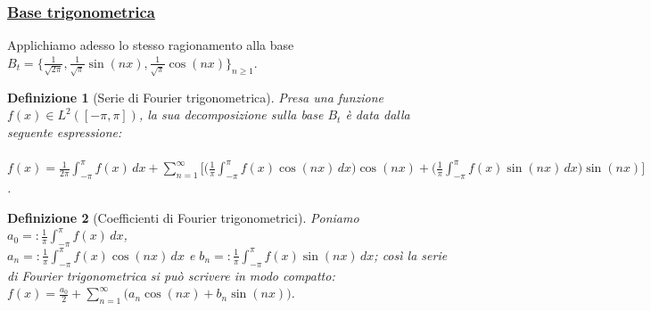 \documentclass[a4paper,12pt]{report}
\newtheorem{definizione}{Definizione}[chapter]
\begin{document}
\subsubsection{\underline{Base trigonometrica}}

Applichiamo adesso lo stesso ragionamento alla base $B_t=\bigg\{\displaystyle\frac{1}{\sqrt{2\pi}}, \frac{1}{\sqrt{\pi}}\sin({nx}), \frac{1}{\sqrt{\pi}}\cos({nx})\bigg\}_{n\geq 1}$.

\begin{definizione}[Serie di Fourier trigonometrica]
    Presa una funzione $f(x)\in L^2([-\pi,\pi])$, la sua decomposizione sulla base $B_t$ è data dalla seguente espressione:
    \\ 
    \\$f(x)=\displaystyle\frac{1}{2\pi}\int_{-\pi}^\pi f(x)\,dx+\sum_{n=1}^\infty\bigg[\bigg(\frac{1}{\pi}\int_{-\pi}^\pi f(x)\cos(nx)\,dx\bigg)\cos(nx)+\bigg(\frac{1}{\pi}\int_{-\pi}^\pi f(x)\sin(nx)\,dx\bigg)\sin(nx)\bigg]$.
\end{definizione}

\begin{definizione}[Coefficienti di Fourier trigonometrici]
    Poniamo $a_0=:\displaystyle\frac{1}{\pi}\int_{-\pi}^\pi f(x)\,dx $, 
    \\ $a_n=:\displaystyle\frac{1}{\pi}\int_{-\pi}^\pi f(x)\cos(nx)\,dx$ e $\displaystyle b_n=:\frac{1}{\pi}\int_{-\pi}^\pi f(x)\sin (nx)\,dx$; così la serie di Fourier trigonometrica si può scrivere in modo compatto: $f(x)=\displaystyle\frac{a_0}{2}+\sum_{n=1}^\infty\bigg(a_n\cos(nx)+b_n\sin(nx)\bigg)$.
\end{definizione}
\end{document}
